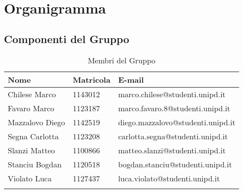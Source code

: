 \section{Organigramma}

\subsection{Componenti del Gruppo}

\begin{longtable}{|C{.25\textwidth}|C{.16\textwidth}|C{.45\textwidth}|}
\hline
\textbf{Nome} & \textbf{Matricola} & \textbf{E-mail}\\
\hline \hline
\endfirsthead
Chilese Marco & 1143012 & marco.chilese@studenti.unipd.it \\
\hline
Favaro Marco & 1123187 & marco.favaro.8@studenti.unipd.it \\
\hline
Mazzalovo Diego & 1142519 & diego.mazzalovo@studenti.unipd.it \\
\hline
Segna Carlotta & 1123208 & carlotta.segna@studenti.unipd.it \\
\hline
Slanzi Matteo & 1100866 & matteo.slanzi@studenti.unipd.it \\
\hline
Stanciu Bogdan & 1120518 & bogdan.stanciu@studenti.unipd.it \\
\hline
Violato Luca & 1127437 & luca.violato@studenti.unipd.it \\
\hline
\caption{Membri del Gruppo}
\label{Tabella Membri del Gruppo}
\end{longtable}
